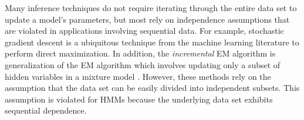 Many inference techniques do not require iterating through the entire data set to update a model's parameters, %
but most %
rely on independence assumptions that are violated in applications involving sequential data. 
%
For example, stochastic gradient descent is a ubiquitous technique from the machine learning literature \citep{Robbins:1951, Johnson:2013, Defazio:2014, Kingma:2014} to perform direct maximization. %
%
In addition, the \textit{incremental} EM algorithm is generalization of the EM algorithm which involves updating only a subset of hidden variables in a mixture model \citep{Neal:1998, Thiesson:2001, Karimi:2019}. %
%
%
However, these methods rely on the assumption that the data set can be easily divided into independent subsets. This assumption is violated for HMMs because the underlying data set exhibits sequential dependence. 

